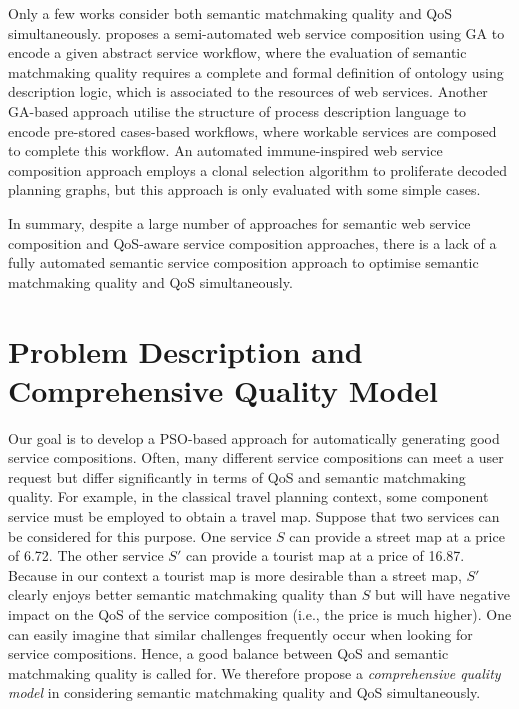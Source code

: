 \documentclass{llncs}
\begin{document}
Only a few works \cite{fanjiang2014semantic,lecue2009optimizing,pop2009immune} consider both semantic matchmaking quality and QoS simultaneously. \cite{lecue2009optimizing} proposes a semi-automated web service composition using GA to encode a given abstract service workflow, where the evaluation of semantic matchmaking quality requires a complete and formal definition of ontology using description logic, which is associated to the resources of web services. Another GA-based approach \cite{fanjiang2014semantic} utilise the structure of process description language to encode pre-stored cases-based workflows, where workable services are composed to complete this workflow. An automated immune-inspired web service composition approach \cite{pop2009immune} employs a clonal selection algorithm to proliferate decoded planning graphs, but this approach is only evaluated with some simple cases.

In summary, despite a large number of approaches for semantic web service composition and QoS-aware service composition approaches, there is a lack of a fully automated semantic service composition approach to optimise semantic matchmaking quality and QoS simultaneously. 
\vspace{-0.3cm}

\section{Problem Description and Comprehensive Quality Model}\label{problemDes}

Our goal is to develop a PSO-based approach for automatically generating good service compositions. Often, many different service compositions can meet a user request but differ significantly in terms of QoS and semantic matchmaking quality. For example, in the classical travel planning context, some component service must be employed to obtain a travel map. Suppose that two services can be considered for this purpose. One service $S$ can provide a street map at a price of 6.72. The other service $S'$ can provide a tourist map at a price of 16.87. Because in our context a tourist map is more desirable than a street map, $S'$ clearly enjoys better semantic matchmaking quality than $S$ but will have negative impact on the QoS of the service composition (i.e., the price is much higher). One can easily imagine that similar challenges frequently occur when looking for service compositions. Hence, a good balance between QoS and semantic matchmaking quality is called for. We therefore propose a \emph{comprehensive quality model} in considering semantic matchmaking quality and QoS simultaneously.
\end{document}
